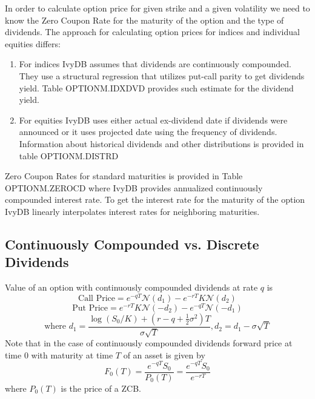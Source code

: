 \documentclass[12pt]{article}
\begin{document}
In order to calculate option price for given strike and a given volatility we need to know the Zero Coupon Rate for the maturity of the option and the type of dividends. The approach for calculating option prices for indices and individual equities differs:
\begin{enumerate}
	\item For indices IvyDB assumes that dividends are continuously compounded. They use a structural regression that utilizes put-call parity to get dividends yield. Table OPTIONM.IDXDVD provides such estimate for the dividend yield. 
	\item For equities IvyDB uses either actual ex-dividend date if dividends were announced or it uses projected date using the frequency of dividends. Information about historical dividends and other distributions is provided in table OPTIONM.DISTRD
\end{enumerate}

Zero Coupon Rates for standard maturities is provided in Table OPTIONM.ZEROCD where IvyDB provides annualized continuously compounded interest rate. To get the interest rate for the maturity of the option IvyDB linearly interpolates interest rates for neighboring maturities. 

\subsection{Continuously Compounded vs. Discrete Dividends}

Value of an option with continuously compounded dividends at rate $q$ is
\[\text{Call Price} = e^{-qT}\mathcal{N}(d_1)-e^{-rT}K\mathcal{N}(d_2)\]
\[\text{Put Price} = e^{-rT}K\mathcal{N}(-d_2) - e^{-qT}\mathcal{N}(-d_1)\]
\[\text{where } d_1 = \frac{\log(S_0/K) + (r - q + \frac{1}{2}\sigma^2)T}{\sigma\sqrt{T}}, d_2 = d_1 - \sigma\sqrt{T}\]
Note that in the case of continuously compounded dividends forward price at time $0$ with maturity at time $T$ of an asset is given by
\[F_0(T) = \frac{e^{-qT}S_0}{P_0(T)} = \frac{e^{-qT}S_0}{e^{-rT}}\]
where $P_0(T)$ is the price of a ZCB. 
\end{document}
